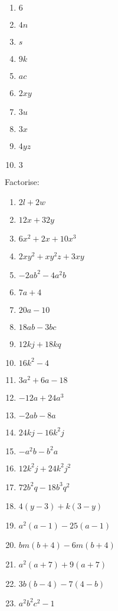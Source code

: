  \begin{solutions}{}{
\begin{enumerate}[label=\textbf{\arabic*}., noitemsep]
\item $6$%
\item $4n$%
\item $s$%
\item $9k$%
\item $ac$%
\item $2xy$%
\item $3u$%
\item $3x$%
\item $4yz$%
\item $3$%
\end{enumerate}
}
\end{solutions}


\begin{exercises}{}{
Factorise:
\begin{multicols}{2}
\begin{enumerate}[itemsep=5pt, label=\textbf{\arabic*}. ] 
\item $2l+2w$
\item $12x+32y$
\item $6{x}^{2}+2x+10{x}^{3}$
\item $2x{y}^{2}+x{y}^{2}z+3xy$
\item $-2a{b}^{2}-4{a}^{2}b$
\item $7a+4$ 
\item $20a-10$ 
\item $18ab-3bc$
\item $12kj+18kq$ 
\item $16{k}^{2}-4$ 
\item $3{a}^{2}+6a-18$
\item $-12a+24a^3$ 
\item $-2ab-8a$ 
\item $24kj-16{k}^{2}j$
\item $-{a}^{2}b-{b}^{2}a$ 
\item $12{k}^{2}j+24{k}^{2}{j}^{2}$ 
\item $72{b}^{2}q-18{b}^{3}{q}^{2}$
\item $4(y-3)+k(3-y)$ 
\item $a^2(a-1)-25(a-1)$ 
\item $bm(b+4)-6m(b+4)$
\item ${a}^{2}(a+7)+9(a+7)$ 
\item $3b(b-4)-7(4-b)$ 
\item ${a}^{2}{b}^{2}{c}^{2}-1$
\end{enumerate}
\end{multicols}

}
\end{exercises}


